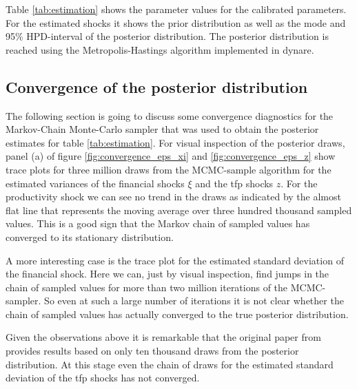 \begin{table}
  \centering
  \caption{Parameterization}
  \label{tab:estimation}
\end{table}

Table \ref{tab:estimation} shows the parameter values for the calibrated
parameters. For the estimated shocks it shows the prior distribution as well as
the mode and 95\% HPD-interval of the posterior distribution. The posterior
distribution is reached using the Metropolis-Hastings algorithm implemented in dynare.

\subsection{Convergence of the posterior distribution}
\label{sec:convergence}

The following section is going to discuss some convergence diagnostics for the
Markov-Chain Monte-Carlo sampler that was used to obtain the posterior
estimates for table \ref{tab:estimation}. For visual inspection of the
posterior draws, panel (a) of figure \ref{fig:convergence_eps_xi} and
\ref{fig:convergence_eps_z} show trace plots for three million draws from the
MCMC-sample algorithm for the estimated variances of the financial shocks
\(\xi\) and the tfp shocks \(z\). For the productivity shock we can see no
trend in the draws as indicated by the almost flat line that represents the
moving average over three hundred thousand sampled values. This is a good sign
that the Markov chain of sampled values has converged to its stationary
distribution.

A more interesting case is the trace plot for the estimated standard deviation
of the financial shock. Here we can, just by visual inspection, find jumps in
the chain of sampled values for more than two million iterations of the
MCMC-sampler. So even at such a large number of iterations it is not clear
whether the chain of sampled values has actually converged to the true
posterior distribution. 

Given the observations above it is remarkable that the original paper from
\textcite{jerman_macroeconomic_2012} provides results based on only ten
thousand draws from the posterior distribution. At this stage even the chain of
draws for the estimated standard deviation of the tfp shocks has not converged.

